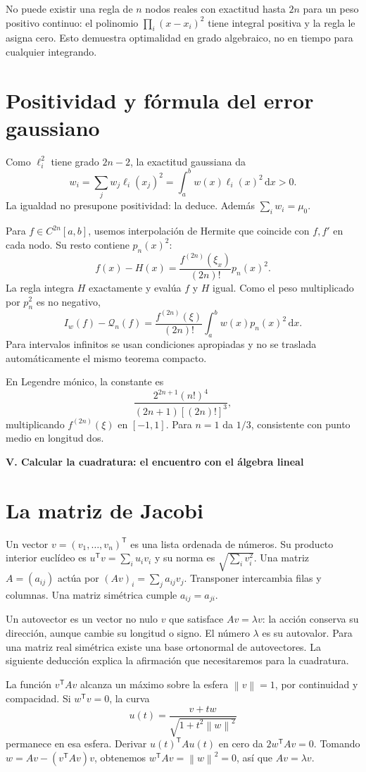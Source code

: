 \documentclass[11pt,a4paper]{article}
\newcommand{\dd}{\,\mathrm d}
\newcommand{\norm}[1]{\left\lVert #1\right\rVert}
\theoremstyle{definition}
\newcommand{\parte}[1]{\par\bigskip\Needspace{8\baselineskip}\begin{center}{\Large\bfseries\color{azul}#1}\end{center}}
\begin{document}
No puede existir una regla de $n$ nodos reales con exactitud hasta $2n$ para un peso positivo continuo: el polinomio $\prod_i(x-x_i)^2$ tiene integral positiva y la regla le asigna cero. Esto demuestra optimalidad en grado algebraico, no en tiempo para cualquier integrando.

\section{Positividad y fórmula del error gaussiano}
Como $\ell_i^2$ tiene grado $2n-2$, la exactitud gaussiana da
\[
w_i=\sum_jw_j\ell_i(x_j)^2=\int_a^b w(x)\ell_i(x)^2\dd x>0.
\]
La igualdad no presupone positividad: la deduce. Además $\sum_iw_i=\mu_0$.

Para $f\in C^{2n}[a,b]$, usemos interpolación de Hermite que coincide con $f,f'$ en cada nodo. Su resto contiene $p_n(x)^2$:
\[
f(x)-H(x)=\frac{f^{(2n)}(\xi_x)}{(2n)!}p_n(x)^2.
\]
La regla integra $H$ exactamente y evalúa $f$ y $H$ igual. Como el peso multiplicado por $p_n^2$ es no negativo,
\[
I_w(f)-\mathcal Q_n(f)=
\frac{f^{(2n)}(\xi)}{(2n)!}\int_a^b w(x)p_n(x)^2\dd x.
\]
Para intervalos infinitos se usan condiciones apropiadas y no se traslada automáticamente el mismo teorema compacto.

En Legendre mónico, la constante es
\[
\frac{2^{2n+1}(n!)^4}{(2n+1)[(2n)!]^3},
\]
multiplicando $f^{(2n)}(\xi)$ en $[-1,1]$. Para $n=1$ da $1/3$, consistente con punto medio en longitud dos.


\parte{V. Calcular la cuadratura: el encuentro con el álgebra lineal}
\section{La matriz de Jacobi}

Un vector $v=(v_1,\ldots,v_n)^{\mathsf T}$ es una lista ordenada de números. Su producto interior euclídeo es $u^{\mathsf T}v=\sum_i u_iv_i$ y su norma es $\sqrt{\sum_i v_i^2}$. Una matriz $A=(a_{ij})$ actúa por $(Av)_i=\sum_j a_{ij}v_j$. Transponer intercambia filas y columnas. Una matriz simétrica cumple $a_{ij}=a_{ji}$.

Un autovector es un vector no nulo $v$ que satisface $Av=\lambda v$: la acción conserva su dirección, aunque cambie su longitud o signo. El número $\lambda$ es su autovalor. Para una matriz real simétrica existe una base ortonormal de autovectores. La siguiente deducción explica la afirmación que necesitaremos para la cuadratura.

La función $v^{\mathsf T}Av$ alcanza un máximo sobre la esfera $\norm v=1$, por continuidad y compacidad. Si $w^{\mathsf T}v=0$, la curva
\[
u(t)=\frac{v+tw}{\sqrt{1+t^2\norm w^2}}
\]
permanece en esa esfera. Derivar $u(t)^{\mathsf T}Au(t)$ en cero da $2w^{\mathsf T}Av=0$. Tomando $w=Av-(v^{\mathsf T}Av)v$, obtenemos $w^{\mathsf T}Av=\norm w^2=0$, así que $Av=\lambda v$.
\end{document}
